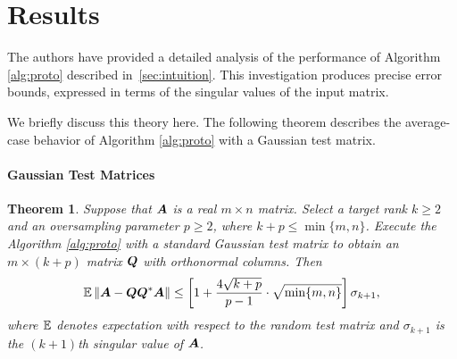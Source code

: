 \documentclass[12pt]{article}
\newtheorem{theorem}{Theorem}
\begin{document}

\section{Results}
\label{sec:prototheorem} 
The authors \cite{RM} have
provided a detailed analysis of the performance of Algorithm \ref{alg:proto} described in~\ref{sec:intuition}. This
investigation produces precise error bounds, expressed in terms of the singular values of the input matrix.

We briefly discuss this theory here.  The following theorem
describes the average-case behavior of Algorithm \ref{alg:proto}
with a Gaussian test matrix. 

\paragraph{Gaussian Test Matrices}
\begin{theorem} %
Suppose that $\bm{A}$ is a real $m \times n$ matrix.  Select
a target rank $k \geq 2$ and an oversampling parameter $p \geq 2$,
where $k + p \leq \min\{m,n\}$.
Execute the Algorithm \ref{alg:proto} with
a standard Gaussian test matrix to obtain an
$m \times (k + p)$ matrix $\bm{Q}$ with orthonormal columns.  Then
\begin{equation}
\label{eq:intro_err_bd}
\operatorname{\mathbb{E}} \left\Vert { \bm{A} - \bm{QQ}^*\bm{A} } \right\Vert
    \leq \left[ 1 + \frac{4 \sqrt{k+p}}{p-1} \cdot\sqrt{\min\{m,n\}} \right] \sigma_{k+1},
\end{equation}
where $\operatorname{\mathbb{E}}$ denotes expectation with respect to the
random test matrix and $\sigma_{k+1}$ is the $(k+1)$th
singular value of $\bm{A}$.
\end{theorem}
\end{document}
